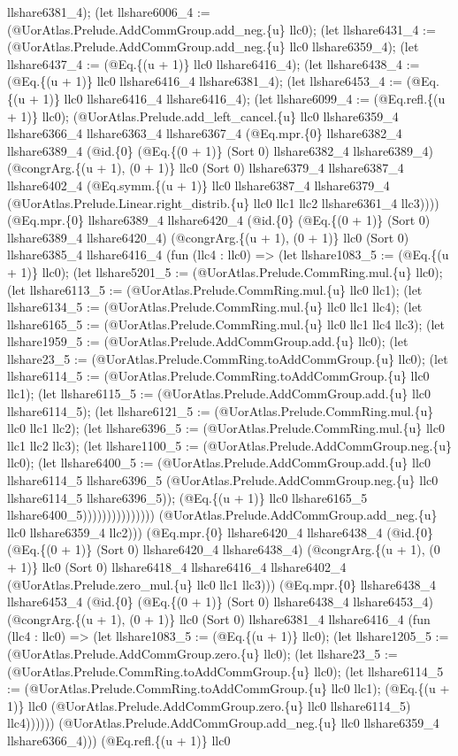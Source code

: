 \documentclass[11pt]{article}
\begin{document}
llshare6381\_4); (let llshare6006\_4 := (@UorAtlas.Prelude.AddCommGroup.add\_neg.\{u\} llc0); (let llshare6431\_4 := (@UorAtlas.Prelude.AddCommGroup.add\_neg.\{u\} llc0 llshare6359\_4); (let llshare6437\_4 := (@Eq.\{(u + 1)\} llc0 llshare6416\_4); (let llshare6438\_4 := (@Eq.\{(u + 1)\} llc0 llshare6416\_4 llshare6381\_4); (let llshare6453\_4 := (@Eq.\{(u + 1)\} llc0 llshare6416\_4 llshare6416\_4); (let llshare6099\_4 := (@Eq.refl.\{(u + 1)\} llc0); (@UorAtlas.Prelude.add\_left\_cancel.\{u\} llc0 llshare6359\_4 llshare6366\_4 llshare6363\_4 llshare6367\_4 (@Eq.mpr.\{0\} llshare6382\_4 llshare6389\_4 (@id.\{0\} (@Eq.\{(0 + 1)\} (Sort 0) llshare6382\_4 llshare6389\_4) (@congrArg.\{(u + 1), (0 + 1)\} llc0 (Sort 0) llshare6379\_4 llshare6387\_4 llshare6402\_4 (@Eq.symm.\{(u + 1)\} llc0 llshare6387\_4 llshare6379\_4 (@UorAtlas.Prelude.Linear.right\_distrib.\{u\} llc0 llc1 llc2 llshare6361\_4 llc3)))) (@Eq.mpr.\{0\} llshare6389\_4 llshare6420\_4 (@id.\{0\} (@Eq.\{(0 + 1)\} (Sort 0) llshare6389\_4 llshare6420\_4) (@congrArg.\{(u + 1), (0 + 1)\} llc0 (Sort 0) llshare6385\_4 llshare6416\_4 (fun (llc4 : llc0) => (let llshare1083\_5 := (@Eq.\{(u + 1)\} llc0); (let llshare5201\_5 := (@UorAtlas.Prelude.CommRing.mul.\{u\} llc0); (let llshare6113\_5 := (@UorAtlas.Prelude.CommRing.mul.\{u\} llc0 llc1); (let llshare6134\_5 := (@UorAtlas.Prelude.CommRing.mul.\{u\} llc0 llc1 llc4); (let llshare6165\_5 := (@UorAtlas.Prelude.CommRing.mul.\{u\} llc0 llc1 llc4 llc3); (let llshare1959\_5 := (@UorAtlas.Prelude.AddCommGroup.add.\{u\} llc0); (let llshare23\_5 := (@UorAtlas.Prelude.CommRing.toAddCommGroup.\{u\} llc0); (let llshare6114\_5 := (@UorAtlas.Prelude.CommRing.toAddCommGroup.\{u\} llc0 llc1); (let llshare6115\_5 := (@UorAtlas.Prelude.AddCommGroup.add.\{u\} llc0 llshare6114\_5); (let llshare6121\_5 := (@UorAtlas.Prelude.CommRing.mul.\{u\} llc0 llc1 llc2); (let llshare6396\_5 := (@UorAtlas.Prelude.CommRing.mul.\{u\} llc0 llc1 llc2 llc3); (let llshare1100\_5 := (@UorAtlas.Prelude.AddCommGroup.neg.\{u\} llc0); (let llshare6400\_5 := (@UorAtlas.Prelude.AddCommGroup.add.\{u\} llc0 llshare6114\_5 llshare6396\_5 (@UorAtlas.Prelude.AddCommGroup.neg.\{u\} llc0 llshare6114\_5 llshare6396\_5)); (@Eq.\{(u + 1)\} llc0 llshare6165\_5 llshare6400\_5))))))))))))))) (@UorAtlas.Prelude.AddCommGroup.add\_neg.\{u\} llc0 llshare6359\_4 llc2))) (@Eq.mpr.\{0\} llshare6420\_4 llshare6438\_4 (@id.\{0\} (@Eq.\{(0 + 1)\} (Sort 0) llshare6420\_4 llshare6438\_4) (@congrArg.\{(u + 1), (0 + 1)\} llc0 (Sort 0) llshare6418\_4 llshare6416\_4 llshare6402\_4 (@UorAtlas.Prelude.zero\_mul.\{u\} llc0 llc1 llc3))) (@Eq.mpr.\{0\} llshare6438\_4 llshare6453\_4 (@id.\{0\} (@Eq.\{(0 + 1)\} (Sort 0) llshare6438\_4 llshare6453\_4) (@congrArg.\{(u + 1), (0 + 1)\} llc0 (Sort 0) llshare6381\_4 llshare6416\_4 (fun (llc4 : llc0) => (let llshare1083\_5 := (@Eq.\{(u + 1)\} llc0); (let llshare1205\_5 := (@UorAtlas.Prelude.AddCommGroup.zero.\{u\} llc0); (let llshare23\_5 := (@UorAtlas.Prelude.CommRing.toAddCommGroup.\{u\} llc0); (let llshare6114\_5 := (@UorAtlas.Prelude.CommRing.toAddCommGroup.\{u\} llc0 llc1); (@Eq.\{(u + 1)\} llc0 (@UorAtlas.Prelude.AddCommGroup.zero.\{u\} llc0 llshare6114\_5) llc4)))))) (@UorAtlas.Prelude.AddCommGroup.add\_neg.\{u\} llc0 llshare6359\_4 llshare6366\_4))) (@Eq.refl.\{(u + 1)\} llc0 
\end{document}
